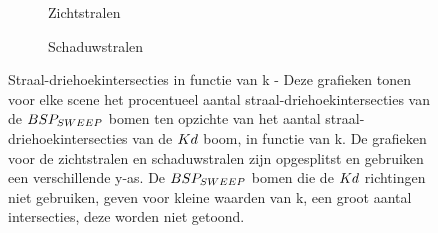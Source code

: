 \begin{figure}
  \centering
  \begin{subfigure}{\linewidth}
  \centering
  \begin{subfigure}[t]{.32\linewidth}
    \centering
{}
  \end{subfigure}
  \begin{subfigure}[t]{.32\linewidth}
    \centering
{}
\end{subfigure}
\begin{subfigure}[t]{.32\linewidth}
  \centering
{}
\end{subfigure}
\caption{Zichtstralen}
\end{subfigure}
\begin{subfigure}{\linewidth}
  \centering
  \begin{subfigure}[t]{.32\linewidth}
    \centering
{}
  \end{subfigure}
  \begin{subfigure}[t]{.32\linewidth}
    \centering
{}
\end{subfigure}
\begin{subfigure}[t]{.32\linewidth}
  \centering
{}
\end{subfigure}
\caption{Schaduwstralen}
\end{subfigure}
\caption[Straal-driehoekintersecties in functie van k]{Straal-driehoekintersecties in functie van k - \small Deze grafieken tonen voor elke scene het procentueel aantal straal-driehoekintersecties van de $BSP_{SWEEP}$ bomen ten opzichte van het aantal straal-driehoekintersecties van de $Kd$ boom, in functie van k. De grafieken voor de zichtstralen en schaduwstralen zijn opgesplitst en gebruiken een verschillende y-as. De $BSP_{SWEEP}$ bomen die de $Kd$ richtingen niet gebruiken, geven voor kleine waarden van k, een groot aantal intersecties, deze worden niet getoond.}
\label{fig:k-intersecties}
\end{figure}

